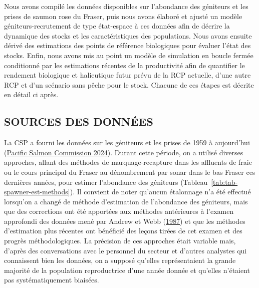 \documentclass[french,11pt]{book}
\begin{document}
Nous avons compilé les données disponibles sur l'abondance des géniteurs et les prises de saumon rose du Fraser, puis nous avons élaboré et ajusté un modèle géniteurs-recrutement de type état-espace à ces données afin de décrire la dynamique des stocks et les caractéristiques des populations. Nous avons ensuite dérivé des estimations des points de référence biologiques pour évaluer l'état des stocks. Enfin, nous avons mis au point un modèle de simulation en boucle fermée conditionné par les estimations récentes de la productivité afin de quantifier le rendement biologique et halieutique futur prévu de la RCP actuelle, d'une autre RCP et d'un scénario sans pêche pour le stock. Chacune de ces étapes est décrite en détail ci après.

\hypertarget{sources-des-donnuxe9es}{%
\subsection{SOURCES DES DONNÉES}\label{sources-des-donnuxe9es}}

La CSP a fourni les données sur les géniteurs et les prises de 1959 à aujourd'hui (\protect\hyperlink{ref-pacificsalmoncommissionFraserRiverPanel2024}{Pacific Salmon Commission 2024}). Durant cette période, on a utilisé diverses approches, allant des méthodes de marquage-recapture dans les affluents de fraie ou le cours principal du Fraser au dénombrement par sonar dans le bas Fraser ces dernières années, pour estimer l'abondance des géniteurs (Tableau~\ref{tab:tab-spawner-est-methods}). Il convient de noter qu'aucun étalonnage n'a été effectué lorsqu'on a changé de méthode d'estimation de l'abondance des géniteurs, mais que des corrections ont été apportées aux méthodes antérieures à l'examen approfondi des données mené par Andrew et Webb (\protect\hyperlink{ref-andrewReviewAssessmentAdult1987}{1987}) et que les méthodes d'estimation plus récentes ont bénéficié des leçons tirées de cet examen et des progrès méthodologiques. La précision de ces approches était variable mais, d'après des conversations avec le personnel du secteur et d'autres analystes qui connaissent bien les données, on a supposé qu'elles représentaient la grande majorité de la population reproductrice d'une année donnée et qu'elles n'étaient pas systématiquement biaisées.
\end{document}
